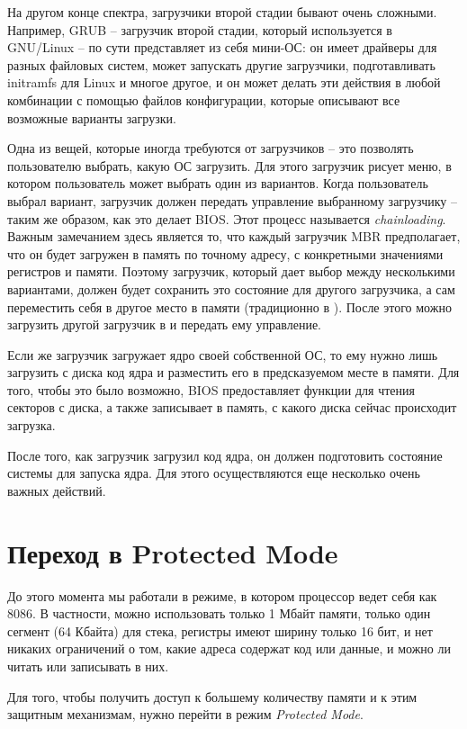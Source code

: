 \documentclass[a4page]{article}
\begin{document}
На другом конце спектра, загрузчики второй стадии бывают очень сложными.
Например, GRUB -- загрузчик второй стадии, который используется в GNU/Linux -- по сути представляет из себя
мини-ОС: он имеет драйверы для разных файловых систем, может запускать другие загрузчики,
подготавливать initramfs для Linux и многое другое, и он может делать эти действия в любой комбинации
с помощью файлов конфигурации, которые описывают все возможные варианты загрузки.

Одна из вещей, которые иногда требуются от загрузчиков -- это позволять пользователю выбрать, какую ОС загрузить.
Для этого загрузчик рисует меню, в котором пользователь может выбрать один из вариантов.
Когда пользователь выбрал вариант, загрузчик должен передать управление выбранному загрузчику --
таким же образом, как это делает BIOS.
Этот процесс называется \emph{chainloading}.
Важным замечанием здесь является то, что каждый загрузчик MBR предполагает,
что он будет загружен в память по точному адресу,
с конкретными значениями регистров и памяти.
Поэтому загрузчик, который дает выбор между несколькими вариантами, должен будет сохранить это состояние для другого загрузчика,
а сам переместить себя в другое место в памяти (традиционно в ).
После этого можно загрузить другой загрузчик в  и передать ему управление.

Если же загрузчик загружает ядро своей собственной ОС, то ему нужно лишь загрузить с диска код ядра
и разместить его в предсказуемом месте в памяти.
Для того, чтобы это было возможно, BIOS предоставляет функции для чтения секторов с диска,
а также записывает в память, с какого диска сейчас происходит загрузка.

После того, как загрузчик загрузил код ядра, он должен подготовить состояние системы для запуска ядра.
Для этого осуществляются еще несколько очень важных действий.

\section{Переход в Protected Mode}

До этого момента мы работали в режиме, в котором процессор ведет себя как 8086.
В частности, можно использовать только 1 Мбайт памяти, только один сегмент (64 Кбайта) для стека,
регистры имеют ширину только 16 бит,
и нет никаких ограничений о том, какие адреса содержат код или данные, и можно ли читать или записывать в них.

Для того, чтобы получить доступ к большему количеству памяти и к этим защитным механизмам,
нужно перейти в режим \emph{Protected Mode}.
\end{document}
